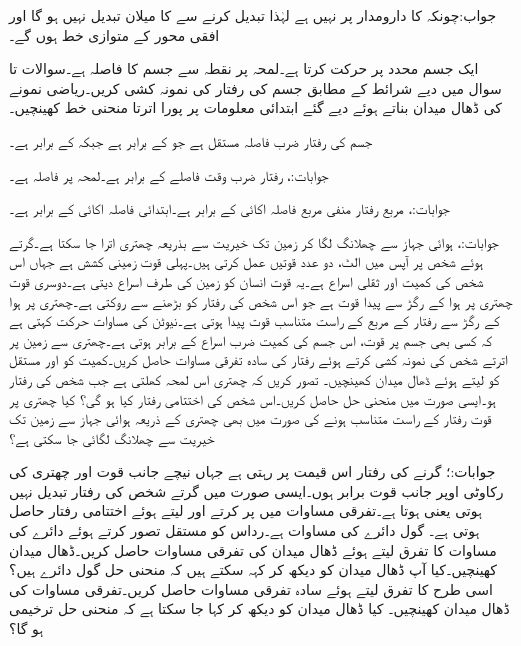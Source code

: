 جواب:چونکہ  کا دارومدار  پر نہیں ہے لہٰذا  تبدیل کرنے سے  کا میلان تبدیل نہیں ہو گا اور  افقی محور کے متوازی خط ہوں گے۔ 

ایک جسم  محدد پر حرکت کرتا ہے۔لمحہ  پر نقطہ  سے جسم کا فاصلہ  ہے۔سوالات  تا سوال  میں دیے شرائط کے مطابق جسم کی رفتار کی نمونہ کشی کریں۔ریاضی نمونے کی ڈھال میدان بناتے ہوئے  دیے گئے ابتدائی معلومات پر پورا اترتا منحنی خط کھینچیں۔ 

جسم کی رفتار ضرب فاصلہ  مستقل ہے جو  کے برابر ہے جبکہ  کے برابر ہے۔

جوابات:، 
رفتار ضرب وقت فاصلے کے برابر ہے۔لمحہ  پر فاصلہ  ہے۔

جوابات:، 
مربع رفتار منفی مربع فاصلہ اکائی کے برابر ہے۔ابتدائی فاصلہ اکائی کے برابر ہے۔

جوابات:، 
ہوائی جہاز سے چھلانگ لگا کر زمین تک خیریت سے بذریعہ چھتری  اترا جا سکتا ہے۔گرتے ہوئے شخص پر آپس میں الٹ، دو عدد قوتیں عمل کرتی ہیں۔پہلی قوت زمینی کشش  ہے جہاں  اس شخص کی کمیت اور  ثقلی اسراع ہے۔یہ قوت انسان کو زمین کی طرف اسراع دیتی ہے۔دوسری قوت چھتری پر ہوا کے رگڑ سے پیدا قوت ہے جو اس شخص کی رفتار کو بڑھنے سے روکتی ہے۔چھتری پر ہوا کے رگڑ سے رفتار کے مربع کے راست   متناسب قوت  پیدا ہوتی ہے۔نیوٹن کی مساوات حرکت کہتی ہے کہ کسی بھی جسم پر قوت، اس جسم کی کمیت ضرب اسراع کے برابر ہوتی ہے۔چھتری سے زمین پر اترتے شخص کی نمونہ کشی کرتے ہوئے رفتار  کی سادہ تفرقی مساوات حاصل کریں۔کمیت کو  اور مستقل کو  لیتے ہوئے ڈھال میدان کھینچیں۔ تصور کریں کہ چھتری اس لمحہ کھلتی ہے جب شخص کی رفتار  ہو۔ایسی صورت میں منحنی حل حاصل کریں۔اس شخص کی اختتامی رفتار کیا ہو گی؟ کیا چھتری پر قوت رفتار کے راست متناسب ہونے کی صورت میں بھی چھتری کے ذریعہ ہوائی جہاز سے زمین تک خیریت سے چھلانگ لگائی جا سکتی ہے؟

جوابات:؛ گرنے کی رفتار اس قیمت پر رہتی ہے جہاں نیچے جانب قوت  اور چھتری کی رکاوٹی اوپر جانب قوت  برابر ہوں۔ایسی صورت میں گرتے شخص کی رفتار تبدیل نہیں ہوتی یعنی  ہوتا ہے۔تفرقی مساوات میں  پر کرتے اور  لیتے ہوئے اختتامی رفتار  حاصل ہوتی ہے۔
گول دائرے کی مساوات  ہے۔رداس  کو مستقل تصور کرتے ہوئے دائرے کی مساوات کا تفرق لیتے ہوئے  ڈھال میدان کی تفرقی مساوات حاصل کریں۔ڈھال میدان کھینچیں۔کیا آپ ڈھال میدان کو دیکھ کر کہہ سکتے ہیں کہ منحنی حل گول دائرے ہیں؟ اسی طرح  کا تفرق لیتے ہوئے سادہ تفرقی مساوات حاصل کریں۔تفرقی مساوات کی ڈھال میدان کھینچیں۔ کیا ڈھال میدان کو دیکھ کر کہا جا سکتا ہے کہ منحنی حل ترخیمی ہو گا؟


